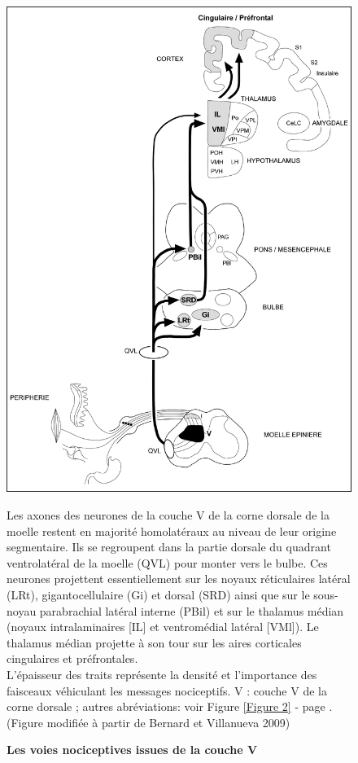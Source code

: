 \documentclass[a4paper,12pt,twoside]{report}
\begin{document}
\begin{figure}[p]

\begin{center}
 \includegraphics[scale=0.85]{Figure3.jpg} 
\end{center}

\caption{\textbf{Les voies nociceptives issues de la couche V}}

{\protect\parbox[t]{18cm}{
\begin{small}Les axones des neurones de la couche V de la corne dorsale de la moelle restent en majorité homolatéraux au niveau de leur origine segmentaire. Ils se regroupent dans la partie dorsale du quadrant ventrolatéral de la moelle (QVL) pour monter vers le bulbe. Ces neurones projettent essentiellement sur les noyaux réticulaires latéral (LRt), gigantocellulaire (Gi) et dorsal (SRD) ainsi que sur le sous-noyau parabrachial latéral interne (PBil) et sur le thalamus médian (noyaux intralaminaires [IL] et ventromédial latéral [VMl]). Le thalamus médian projette à son tour sur les aires corticales cingulaires et préfrontales.\\ L'épaisseur des traits représente la densité et l'importance des faisceaux véhiculant les messages nociceptifs. V : couche V de la corne dorsale ; autres abréviations: voir Figure \ref{Figure 2} - page \pageref{Figure 2}. (Figure modifiée à partir de Bernard et Villanueva 2009) \end{small}}}

\label{Figure 3}

\end{figure}
\end{document}
